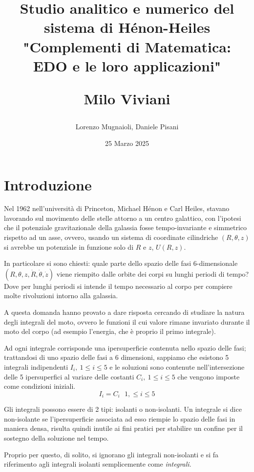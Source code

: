 \documentclass[a4paper, 12pt]{article}
\title{
	Studio analitico e numerico del sistema di Hénon-Heiles\\
	\vspace{1cm}	
	"Complementi di Matematica: EDO e le loro applicazioni"\\
	\begin{large}
		Milo Viviani
	\end{large}
	\vspace{1cm}

}
\date{25 Marzo 2025}
\author{Lorenzo Mugnaioli, Daniele Pisani}
\numberwithin{equation}{section}
\numberwithin{figure}{section}
\begin{document}
\maketitle
\clearpage
\tableofcontents
\clearpage

\section{Introduzione}
Nel 1962 nell'università di Princeton, Michael Hénon e  Carl Heiles,
stavano lavorando sul movimento delle stelle attorno a un centro galattico,
con l'ipotesi che il potenziale gravitazionale della galassia fosse tempo-invariante e simmetrico
rispetto ad un asse, ovvero, usando un sistema di coordinate cilindriche $(R,\theta,z)$ si avrebbe 
un potenziale in funzione solo di $R$ e $z$, $U(R,z)$.

In particolare si sono chiesti: quale parte dello spazio delle fasi 6-dimensi\-onale
$(R,\theta,z, \dot{R},\dot{\theta}, \dot{z})$ viene riempito dalle orbite dei corpi su lunghi
periodi di tempo? \cite{1964henonheiles}
Dove per lunghi periodi si intende il tempo necessario al corpo per compiere molte rivoluzioni
intorno alla galassia.

A questa domanda hanno provato a dare risposta cercando di studiare la natura degli integrali del moto,
ovvero le funzioni il cui valore rimane invariato durante il moto del corpo (ad esempio l'energia,
che è proprio il primo integrale).

Ad ogni integrale corrisponde una ipersuperficie contenuta nello spazio delle fasi; trattandosi di uno spazio
delle fasi a 6 dimensioni, sappiamo che esistono 5 integrali indipendenti $I_i,\ 1\le i\le 5$ e le soluzioni
sono contenute nell'intersezione delle 5 ipersuperfici al variare delle costanti
$C_i,\ 1\le i\le 5$ che vengono imposte come condizioni iniziali.
\begin{equation}
	I_i = C_i\ \ \  1,\le i\le 5
\end{equation}

Gli integrali possono essere di 2 tipi: isolanti o non-isolanti. Un integrale si dice non-isolante
se l'ipersuperficie associata ad esso riempie lo spazio delle fasi in maniera densa, risulta quindi inutile
ai fini pratici per stabilire un confine per il sostegno della soluzione nel tempo.

Proprio per questo, di solito, si ignorano gli integrali non-isolanti e si fa riferimento agli integrali isolanti semplicemente
come \textit{integrali}.
\end{document}
